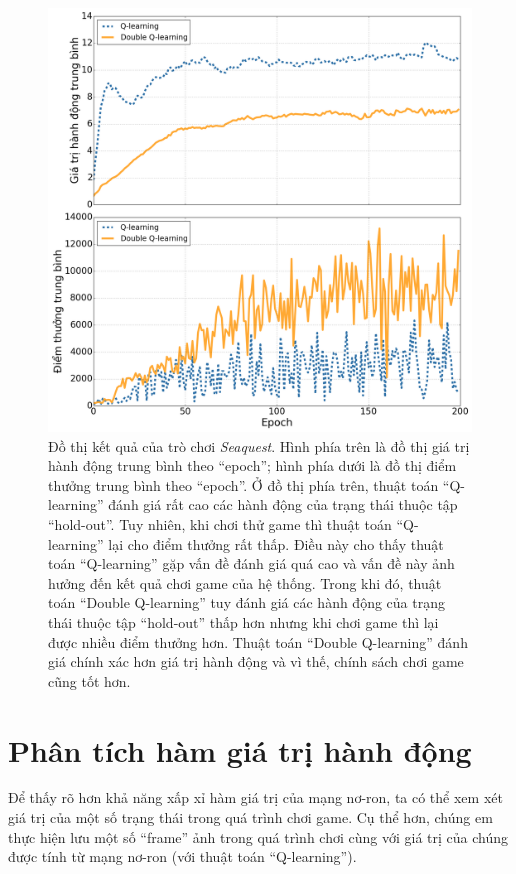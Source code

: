 	\begin{figure}
		\centering
		\includegraphics[width=\textwidth]{double_compare}
		\caption[Đồ thị giá trị hành động trung bình và điểm thưởng trung bình của hai thuật toán]{
		Đồ thị kết quả của trò chơi \textit{Seaquest}.
		Hình phía trên là đồ thị giá trị hành động trung bình theo ``epoch''; hình phía dưới là đồ thị điểm thưởng trung bình theo ``epoch''.
		Ở đồ thị phía trên, thuật toán ``Q-learning'' đánh giá rất cao các hành động của trạng thái thuộc tập ``hold-out''.
		Tuy nhiên, khi chơi thử game thì thuật toán ``Q-learning'' lại cho điểm thưởng rất thấp.
		Điều này cho thấy thuật toán ``Q-learning'' gặp vấn đề đánh giá quá cao và vấn đề này ảnh hưởng đến kết quả chơi game của hệ thống.
		Trong khi đó, thuật toán ``Double Q-learning'' tuy đánh giá các hành động của trạng thái thuộc tập ``hold-out'' thấp hơn nhưng khi chơi game thì lại được nhiều điểm thưởng hơn.
		Thuật toán ``Double Q-learning'' đánh giá chính xác hơn giá trị hành động và vì thế, chính sách chơi game cũng tốt hơn.}
		\label{fig_double_compare}
	\end{figure}
		
\section{Phân tích hàm giá trị hành động}
	Để thấy rõ hơn khả năng xấp xỉ hàm giá trị của mạng nơ-ron, ta có thể xem xét giá trị của một số trạng thái trong quá trình chơi game.
	Cụ thể hơn, chúng em thực hiện lưu một số ``frame'' ảnh trong quá trình chơi cùng với giá trị của chúng được tính từ mạng nơ-ron (với thuật toán ``Q-learning'').
	

